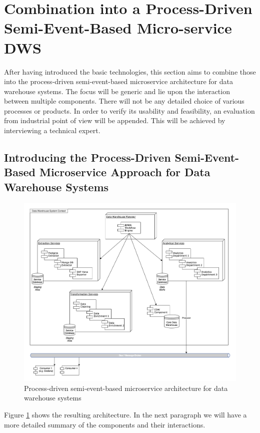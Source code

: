 \section{Combination into a Process-Driven Semi-Event-Based Micro-service DWS}
\label{sec:finalArchitecture}
After having introduced the basic technologies, this section aims to combine those into the process-driven semi-event-based microservice architecture for data warehouse systems. The focus will be generic and lie upon the interaction between multiple components. There will not be any detailed choice of various processes or products. In order to verify its usability and feasibility, an evaluation from industrial point of view will be appended. This will be achieved by interviewing a technical expert.

\subsection{Introducing the Process-Driven Semi-Event-Based Microservice Approach for Data Warehouse Systems}
\begin{figure}[!htb]
    \centering
    \includegraphics[scale=0.43]{pictures/ResultingArchitecture.png}
    \caption{Process-driven semi-event-based microservice architecture for data warehouse systems}
    \label{fig:resultingArch}
\end{figure}
Figure \ref{fig:resultingArch} shows the resulting architecture. In the next paragraph we will have a more detailed summary of the components and their interactions.\newline
